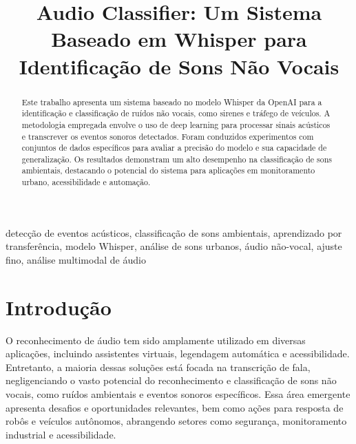 \documentclass[conference]{IEEEtran}
\begin{document}
\title{Audio Classifier: Um Sistema Baseado em Whisper para Identificação de Sons Não Vocais}

\author{
}

\maketitle

\begin{abstract}
Este trabalho apresenta um sistema baseado no modelo Whisper da OpenAI para a identificação e classificação de ruídos não vocais, como sirenes e tráfego de veículos. A metodologia empregada envolve o uso de deep learning para processar sinais acústicos e transcrever os eventos sonoros detectados. Foram conduzidos experimentos com conjuntos de dados específicos para avaliar a precisão do modelo e sua capacidade de generalização. Os resultados demonstram um alto desempenho na classificação de sons ambientais, destacando o potencial do sistema para aplicações em monitoramento urbano, acessibilidade e automação.
\end{abstract}

\begin{IEEEkeywords}
detecção de eventos acústicos, classificação de sons ambientais, aprendizado por transferência, modelo Whisper, análise de sons urbanos, áudio não-vocal, ajuste fino, análise multimodal de áudio
\end{IEEEkeywords}

\section{Introdução}
O reconhecimento de áudio tem sido amplamente utilizado em diversas aplicações, incluindo assistentes virtuais, legendagem automática e acessibilidade. Entretanto, a maioria dessas soluções está focada na transcrição de fala, negligenciando o vasto potencial do reconhecimento e classificação de sons não vocais, como ruídos ambientais e eventos sonoros específicos. Essa área emergente apresenta desafios e oportunidades relevantes, bem como ações para resposta de robôs e veículos autônomos, abrangendo setores como segurança, monitoramento industrial e acessibilidade.
\end{document}
